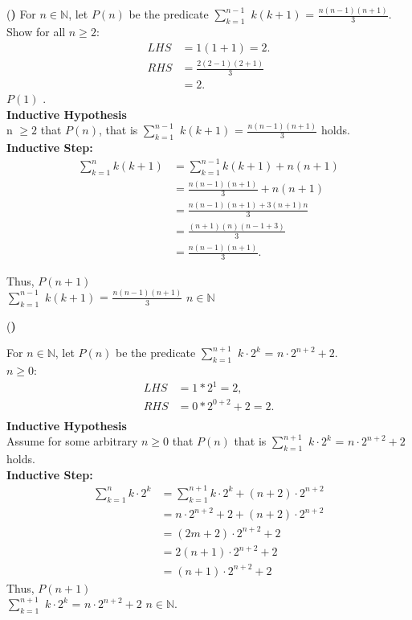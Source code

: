 \documentclass[12pt]{article}
\newcounter{problemnum}
\newcommand{\newprob}{\addtocounter{problemnum}{1} \noindent (\textbf{\arabic{problemnum}) }}
\begin{document}
\newprob
For $n \in \mathbb{N}$, let $P(n)$ be the predicate $\sum_{k=1}^{n-1}$ $k(k+1)$ = $\frac{n(n-1)(n+1)}{3}$.
Show for all $n \geq 2$:
\begin{align*}
LHS
&=1(1+1)=2.\\
RHS
&=\frac{2(2-1)(2+1)}{3}\\
&=2.
\end{align*}
\therefore $P(1)$ .\\
\textbf{Inductive Hypothesis}\\
 n $  \geq 2$ that $P(n)$, that is $\sum_{k=1}^{n-1}$ $k(k+1)$ = $\frac{n(n-1)(n+1)}{3}$ holds.\\
\textbf{Inductive Step:}\\

\begin{align*}
\sum_{k=1}^{n} k(k+1)
&=\sum_{k=1}^{n-1} k(k+1)+n(n+1)\\
&=\frac{n(n-1)(n+1)}{3}+n(n+1)\\
&=\frac{n(n-1)(n+1)+3(n+1)n}{3}\\
&=\frac{(n+1)(n)(n-1+3)}{3}\\
&=\frac{n(n-1)(n+1)}{3}.
\end{align*}

Thus, $P(n+1)$ \\
$\sum_{k=1}^{n-1}$ $k(k+1)$ = $\frac{n(n-1)(n+1)}{3}$ $n \in \mathbb{N}$

\newprob

For $n \in \mathbb{N}$, let $P(n)$ be the predicate $\sum_{k=1}^{n+1}$ $k \cdot 2^k$ = $n \cdot 2^{n+2}+2$.\\
 $n \geq 0$:
\begin{align*}
LHS
&=1*2^1=2,\\
RHS
&=0*2^{0+2}+2=2.\\
\end{align*}
\textbf{Inductive Hypothesis}\\
Assume for some arbitrary $n \geq 0$ that $P(n)$ that is $\sum_{k=1}^{n+1}$ $k \cdot 2^k$ = $n \cdot 2^{n+2}+2$ holds.\\
\textbf{Inductive Step:}\\
\begin{align*}
\sum_{k=1}^{n} k \cdot 2^k
&=\sum_{k=1}^{n+1} k \cdot 2^k + (n+2) \cdot 2^{n+2}\\
&=n \cdot 2^{n+2}+2+(n+2)\cdot 2^{n+2}\\
&=(2m+2) \cdot 2^{n+2}+2\\
&=2(n+1) \cdot 2^{n+2}+2\\
&=(n+1) \cdot 2^{n+2} +2
\end{align*}
Thus, $P(n+1)$ \\
 $\sum_{k=1}^{n+1}$
$k \cdot 2^k$ = $n \cdot 2^{n+2}+2$ $n \in \mathbb{N}$.
\end{document}
